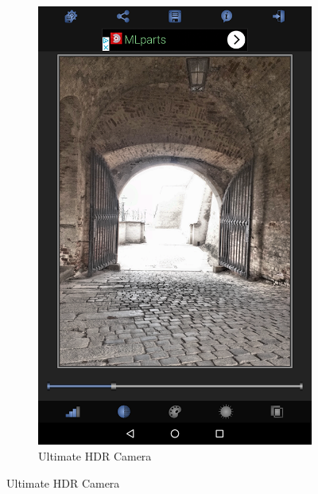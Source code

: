 \begin{figure}[t]
\begin{subfigure}{0.4\textwidth}
        \includegraphics[width=\textwidth]{figures/ui/apps/uiUltimateHdr}
        \caption{Ultimate HDR Camera}
        \label{fig:appsUI_4}
    \end{subfigure}


\end{figure}
